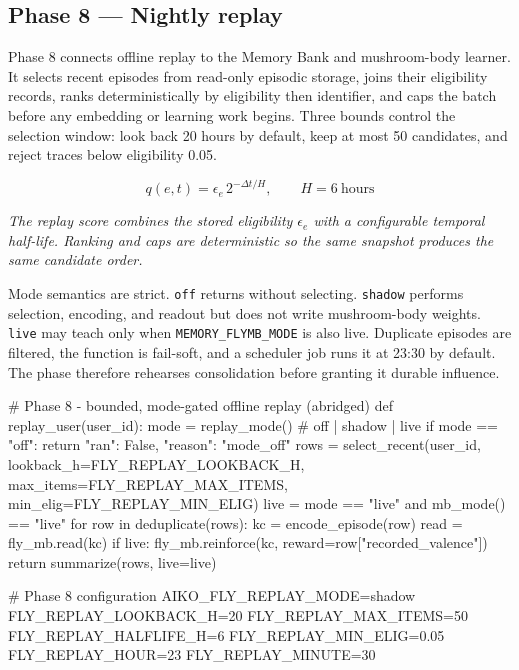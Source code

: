 \documentclass[11pt]{article}
\begin{document}
\subsection{Phase 8 — Nightly replay}

Phase 8 connects offline replay to the Memory Bank and mushroom-body learner. It selects recent episodes from read-only episodic storage, joins their eligibility records, ranks deterministically by eligibility then identifier, and caps the batch before any embedding or learning work begins. Three bounds control the selection window: look back 20 hours by default, keep at most 50 candidates, and reject traces below eligibility 0.05.

\begin{equation}
q(e,t)=\epsilon_e\,2^{-\Delta t/H},\qquad H=6\ \mathrm{hours}
\tag{8}
\end{equation}

\noindent\emph{The replay score combines the stored eligibility \(\epsilon_e\) with a configurable temporal half-life. Ranking and caps are deterministic so the same snapshot produces the same candidate order.}

Mode semantics are strict. \texttt{off} returns without selecting. \texttt{shadow} performs selection, encoding, and readout but does not write mushroom-body weights. \texttt{live} may teach only when \texttt{MEMORY\_FLYMB\_MODE} is also live. Duplicate episodes are filtered, the function is fail-soft, and a scheduler job runs it at 23:30 by default. The phase therefore rehearses consolidation before granting it durable influence.

\begin{CodeBlock}
# Phase 8 - bounded, mode-gated offline replay (abridged)
def replay_user(user_id):
    mode = replay_mode()                 # off | shadow | live
    if mode == "off":
        return {"ran": False, "reason": "mode_off"}
    rows = select_recent(user_id,
                         lookback_h=FLY_REPLAY_LOOKBACK_H,
                         max_items=FLY_REPLAY_MAX_ITEMS,
                         min_elig=FLY_REPLAY_MIN_ELIG)
    live = mode == "live" and mb_mode() == "live"
    for row in deduplicate(rows):
        kc = encode_episode(row)
        read = fly_mb.read(kc)
        if live:
            fly_mb.reinforce(kc, reward=row["recorded_valence"])
    return summarize(rows, live=live)
\end{CodeBlock}

\begin{CodeBlock}
# Phase 8 configuration
AIKO_FLY_REPLAY_MODE=shadow
FLY_REPLAY_LOOKBACK_H=20
FLY_REPLAY_MAX_ITEMS=50
FLY_REPLAY_HALFLIFE_H=6
FLY_REPLAY_MIN_ELIG=0.05
FLY_REPLAY_HOUR=23
FLY_REPLAY_MINUTE=30
\end{CodeBlock}
\end{document}
